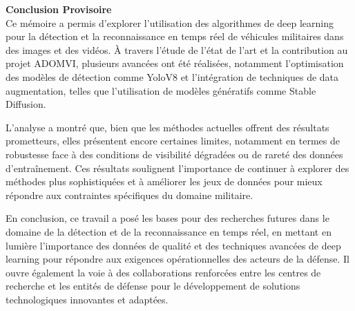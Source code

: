 \sloppy

\textbf{Conclusion Provisoire}\\


Ce mémoire a permis d'explorer l'utilisation des algorithmes de deep learning pour la détection et la reconnaissance en temps réel de véhicules militaires dans des images et des vidéos.
À travers l'étude de l'état de l'art et la contribution au projet ADOMVI, plusieurs avancées ont été réalisées, notamment l'optimisation des modèles de détection comme YoloV8 et l'intégration de techniques de data augmentation, telles que l'utilisation de modèles génératifs comme Stable Diffusion.

L'analyse a montré que, bien que les méthodes actuelles offrent des résultats prometteurs, elles présentent encore certaines limites, notamment en termes de robustesse face à des conditions de visibilité dégradées ou de rareté des données d'entraînement.
Ces résultats soulignent l'importance de continuer à explorer des méthodes plus sophistiquées et à améliorer les jeux de données pour mieux répondre aux contraintes spécifiques du domaine militaire.

En conclusion, ce travail a posé les bases pour des recherches futures dans le domaine de la détection et de la reconnaissance en temps réel, en mettant en lumière l'importance des données de qualité et des techniques avancées de deep learning pour répondre aux exigences opérationnelles des acteurs de la défense.
Il ouvre également la voie à des collaborations renforcées entre les centres de recherche et les entités de défense pour le développement de solutions technologiques innovantes et adaptées.

